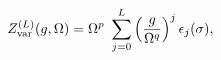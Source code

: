 \begin{equation}
\label{FP-VAR}
Z_{\rm var}^{(L)}(g,\Omega)
 = \Omega^{p} \ \sum_{j=0}^L \left(\frac{g}{\Omega^q}\right)^j \epsilon_j(\sigma),~~~
\end{equation}

